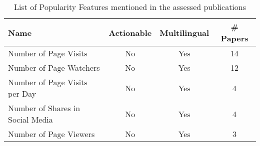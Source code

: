 \begin{table}[htbp]
    \caption{List of Popularity Features mentioned in the assessed publications}
    \label{tab:feat_Popularity}
    \centering
    \begin{tabular}{m{} c c c}
        \toprule
        \textbf{Name} & \textbf{Actionable} & \textbf{Multilingual} & \textbf{\# Papers} \\ 
        \midrule
        Number of Page Visits & No & Yes & 14 \\
        Number of Page Watchers & No & Yes & 12 \\
        Number of Page Visits per Day & No & Yes & 4 \\
        Number of Shares in Social Media & No & Yes & 4 \\
        Number of Page Viewers & No & Yes & 3 \\
        \bottomrule
    \end{tabular}
\end{table}